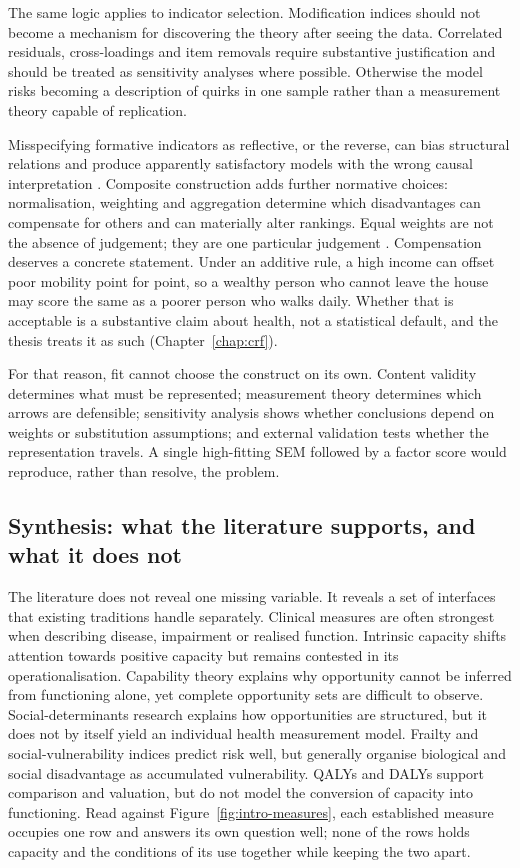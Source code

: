 The same logic applies to indicator selection. Modification indices should not become a mechanism for discovering the theory after seeing the data. Correlated residuals, cross-loadings and item removals require substantive justification and should be treated as sensitivity analyses where possible. Otherwise the model risks becoming a description of quirks in one sample rather than a measurement theory capable of replication.

Misspecifying formative indicators as reflective, or the reverse, can bias
structural relations and produce apparently satisfactory models with the wrong
causal interpretation \citep{jarvis_2003}. Composite construction adds further
normative choices: normalisation, weighting and aggregation determine which
disadvantages can compensate for others and can materially alter rankings.
Equal weights are not the absence of judgement; they are one particular
judgement \citep{greco_2019}. Compensation deserves a concrete statement. Under
an additive rule, a high income can offset poor mobility point for point, so a
wealthy person who cannot leave the house may score the same as a poorer
person who walks daily. Whether that is acceptable is a substantive claim about
health, not a statistical default, and the thesis treats it as such
(Chapter~\ref{chap:crf}).

For that reason, fit cannot choose the construct on its own. Content validity
determines what must be represented; measurement theory determines which arrows
are defensible; sensitivity analysis shows whether conclusions depend on
weights or substitution assumptions; and external validation tests whether the
representation travels. A single high-fitting SEM followed by a factor score
would reproduce, rather than resolve, the problem.

\subsection{Synthesis: what the literature supports, and what it does not}

The literature does not reveal one missing variable. It reveals a set of
interfaces that existing traditions handle separately. Clinical measures are
often strongest when describing disease, impairment or realised function.
Intrinsic capacity shifts attention towards positive capacity but remains
contested in its operationalisation. Capability theory explains why opportunity
cannot be inferred from functioning alone, yet complete opportunity sets are
difficult to observe. Social-determinants research explains how opportunities
are structured, but it does not by itself yield an individual health
measurement model. Frailty and social-vulnerability indices predict risk well,
but generally organise biological and social disadvantage as accumulated
vulnerability. QALYs and DALYs support comparison and valuation, but do not
model the conversion of capacity into functioning. Read against
Figure~\ref{fig:intro-measures}, each established measure occupies one row and
answers its own question well; none of the rows holds capacity and the
conditions of its use together while keeping the two apart.

